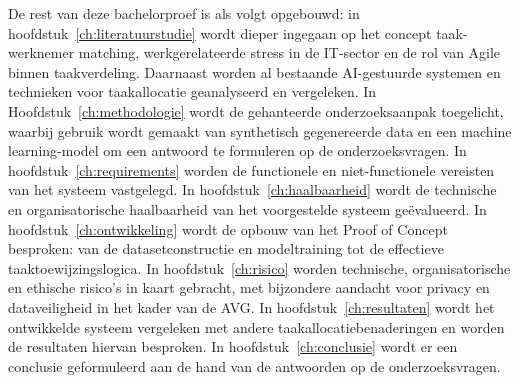 
De rest van deze bachelorproef is als volgt opgebouwd: in hoofdstuk~\ref{ch:literatuurstudie} wordt dieper ingegaan op het concept taak-werknemer matching, werkgerelateerde stress in de IT-sector en de rol van Agile binnen taakverdeling. Daarnaast worden al bestaande AI-gestuurde systemen en technieken voor taakallocatie geanalyseerd en vergeleken. In Hoofdstuk~\ref{ch:methodologie} wordt de gehanteerde onderzoeksaanpak toegelicht, waarbij gebruik wordt gemaakt van synthetisch gegenereerde data en een machine learning-model om een antwoord te formuleren op de onderzoeksvragen. In hoofdstuk~\ref{ch:requirements} worden de functionele en niet-functionele vereisten van het systeem vastgelegd. In hoofdstuk~\ref{ch:haalbaarheid} wordt de technische en organisatorische haalbaarheid van het voorgestelde systeem geëvalueerd. In hoofdstuk~\ref{ch:ontwikkeling} wordt de opbouw van het Proof of Concept besproken: van de datasetconstructie en modeltraining tot de effectieve taaktoewijzingslogica. In hoofdstuk~\ref{ch:risico} worden technische, organisatorische en ethische risico's in kaart gebracht, met bijzondere aandacht voor privacy en dataveiligheid in het kader van de AVG. In hoofdstuk~\ref{ch:resultaten} wordt het ontwikkelde systeem vergeleken met andere taakallocatiebenaderingen en worden de resultaten hiervan besproken. In hoofdstuk~\ref{ch:conclusie} wordt er een conclusie geformuleerd aan de hand van de antwoorden op de onderzoeksvragen.